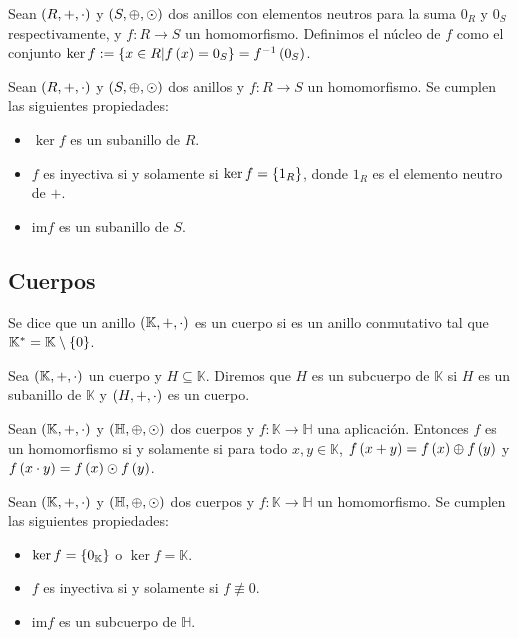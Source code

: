 \begin{definition}
  \rm Sean $\left(R,+,\cdot\right)$ y $\left(S,\oplus,\odot\right)$ dos anillos con elementos neutros para la suma $0_R$ y $0_S$ respectivamente, y $f:R\rightarrow S$ un homomorfismo. Definimos el núcleo de $f$ como el conjunto $\ker f:=\left\{x\in R\middle|f\left(x\right)=0_S\right\}=f^{-1}\left(0_S\right)$.
\end{definition}

\begin{proposition}
  \rm Sean $\left(R,+,\cdot\right)$ y $\left(S,\oplus,\odot\right)$ dos anillos y $f:R\rightarrow S$ un homomorfismo. Se cumplen las siguientes propiedades:

  \begin{itemize}
    \item[1.] $\ker f$ es un subanillo de $R$.
    \item[2.] $f$ es inyectiva si y solamente si $\ker f=\left\{1_R\right\}$, donde $1_R$ es el elemento neutro de $+$.
    \item[3.] $\text{im} f$ es un subanillo de $S$.  
  \end{itemize}
\end{proposition}
\subsection{Cuerpos}

\begin{definition}
  \rm Se dice que un anillo $\left(\mathbb{K},+,\cdot\right)$ es un cuerpo si es un anillo conmutativo tal que $\mathbb{K}^*=\mathbb{K}\setminus\left\{0\right\}$. 
\end{definition}

\begin{definition}
  \rm Sea $\left(\mathbb{K},+,\cdot\right)$ un cuerpo y $H\subseteq\mathbb{K}$. Diremos que $H$ es un subcuerpo de $\mathbb{K}$ si $H$ es un subanillo de $\mathbb{K}$ y $\left(H,+,\cdot\right)$ es un cuerpo.
\end{definition}

\begin{proposition}
  \rm Sean $\left(\mathbb{K},+,\cdot\right)$ y $\left(\mathbb{H},\oplus, \odot\right)$ dos cuerpos y $f:\mathbb{K}\rightarrow\mathbb{H}$ una aplicación. Entonces $f$ es un homomorfismo si y solamente si para todo $x,y\in\mathbb{K}$, $f\left(x+y\right)=f\left(x\right)\oplus f\left(y\right)$ y $f\left(x\cdot y\right)=f\left(x\right)\odot f\left(y\right)$.
\end{proposition}

\begin{proposition}
  \rm Sean $\left(\mathbb{K},+,\cdot\right)$ y $\left(\mathbb{H},\oplus, \odot\right)$ dos cuerpos y $f:\mathbb{K}\rightarrow\mathbb{H}$ un homomorfismo. Se cumplen las siguientes propiedades:

  \begin{itemize}
    \item[1.] $\ker f=\left\{0_\mathbb{K}\right\}$ o $\ker f=\mathbb{K}$.
    \item[2.] $f$ es inyectiva si y solamente si $f\not\equiv 0$.
    \item[3.] $\text{im} f$ es un subcuerpo de $\mathbb{H}$.
  \end{itemize}
\end{proposition}
